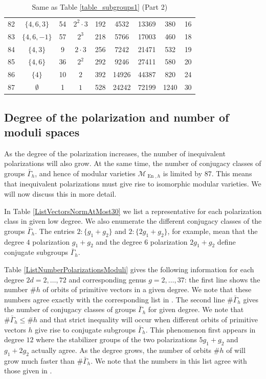 \documentclass[a4paper,11pt]{article}
\newcommand{\cM}{\mathcal M}
\newcommand{\En}{\mathop{\mathrm {En}}\nolimits}
\begin{document}
\begin{table}
\begin{center}
{\begin{tabular}{|c|c|c|c|c|c|c|c|c|}
82 & $\{4,6,3\}$ & 54 & $2^{2} \cdot 3$ & 192 & 4532 & 13369 & 380 & 16\\
83 & $\{4,6,-1\}$ & 57 & $2^{3}$ & 218 & 5766 & 17003 & 460 & 18\\
84 & $\{4,3\}$ & 9 & $2 \cdot 3$ & 256 & 7242 & 21471 & 532 & 19\\
85 & $\{4,6\}$ & 36 & $2^{2}$ & 292 & 9246 & 27411 & 580 & 20\\
86 & $\{4\}$ & 10 & $2$ & 392 & 14926 & 44387 & 820 & 24\\
87 & $\emptyset$ & 1 & $1$ & 528 & 24242 & 72199 & 1240 & 30\\
\hline
\end{tabular}
}
\caption{Same as Table \ref{table_subgroups1} (Part 2)}\label{table_subgroups2}
\end{center}
\end{table}

\newpage

\subsection{Degree of the polarization and number of moduli spaces}\label{subsec:comparisondegree}

As the degree of the polarization increases, the number of inequivalent polarizations will also grow. At the same time, the number of conjugacy classes of groups $\bar \Gamma_h$, and hence of
modular varieties $\cM_{\En,h}$ is limited by $87$. This means that inequivalent polarizations must give rise to isomorphic modular varieties. We will now discuss this in more detail.

In Table \ref{ListVectorsNormAtMost30} we list a representative for each polarization class in given low degree. We also enumerate the different conjugacy classes of the groups $\bar \Gamma_h$.
The entries $2 : \{g_{1}+g_{2}\}$ and $2 : \{2g_{1}+g_{2}\}$, for example, mean that the degree $4$ polarization $g_{1}+g_{2}$ and the degree $6$ polarization $2g_{1}+g_{2}$ define conjugate
subgroups $\bar \Gamma_h$.

Table \ref{ListNumberPolarizationsModuli} gives the following information for each degree $2d=2, \ldots, 72$ and
corresponding genus $g=2, \ldots, 37$: the first line shows the number $\# h$ of orbits of primitive vectors in a given degree.
We note that these numbers agree exactly with the corresponding list in \cite[Appendix]{CDGK}.
The second line $\# \bar \Gamma_h$ gives the number of conjugacy classes of groups $\bar \Gamma_h$ for given degree. We note that  $\# \bar \Gamma_h \leq \# h$ and that strict inequality will occur when different
orbits of primitive vectors $h$ give rise to conjugate subgroups $\bar \Gamma_h$.
This phenomenon first appears in degree $12$ where the stabilizer groups of the two polarizations $5g_1 + g_2$ and $g_1 + 2g_2$ actually agree.
As the degree grows, the number of orbits $\# h$ of will grow much faster than $\# \bar \Gamma_h$.
We note that the numbers in this list agree with those given in  \cite[Corollary 5.6]{GH3}.
\end{document}
